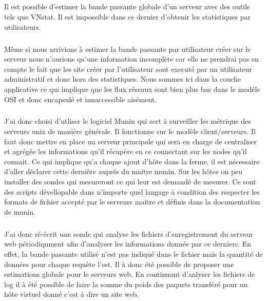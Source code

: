 \documentclass[11pt, a4paper ]{article}
\begin{document}
\begin{spacing}{1.5}
\subparagraph{}
Il est possible d'estimer la bande passante globale d'un serveur avec des outils tels que VNstat. Il est impossible dans ce dernier d'obtenir les statistiques par utilisateurs. 
%
\subparagraph{}
Même si nous arrivions à estimer la bande passante par utilisateur créer sur le serveur nous n'aurions qu'une information incomplète car elle ne prendrai pas en compte le fait que les site créer par l'utilisateur sont executé par un utilisateur administratif et donc hors des statistiques. Nous sommes ici dans la couche applicative ce qui implique que les flux réseaux sont bien plus bas dans le modéle OSI et donc encapsulé et innaccessible aisément.
\subparagraph{}
J'ai donc choisi d'utliser le logiciel Munin qui sert à surveiller les métrique des serveurs unix de manière générale. Il fonctionne sur le modèle client/serveurs. Il faut donc mettre en place un serveur principale qui sera en charge de centraliser et agrégée les informations qu'il récupère en ce connectant sur les nodes qu'il connait. Ce qui implique qu'a chaque ajout d'hôte dans la ferme, il est nécessaire d'aller déclarer cette dernière auprés du maitre munin. 
Sur les hôtes on peu installer des sondes qui mesureront ce qui leur est demandé de mesurer. Ce sont des scripts dévellopable dans n'importe quel langage à condition des respecter les formats de fichier accepté par le serveurs maitre et définis dans la documentation de munin.
\subparagraph{}
J'ai donc ré-écrit une sonde qui analyse les fichiers d'enregistrement du serveur web périodiqument afin d'analyser les informations donnée par ce derniers. En effet, la bande passante utilisé n'est pas indiqué dans le fichier mais la quantité de données pour chaque requète l'est. Il à donc été possible de proposer une estimations globale pour le serveurs web. En continuant d'anlyser les fichiers de log il à été possible de faire la somme du poids des paquets transféré pour un hôte virtuel donné c'est à dire un site web.

\end{spacing}
\end{document}
